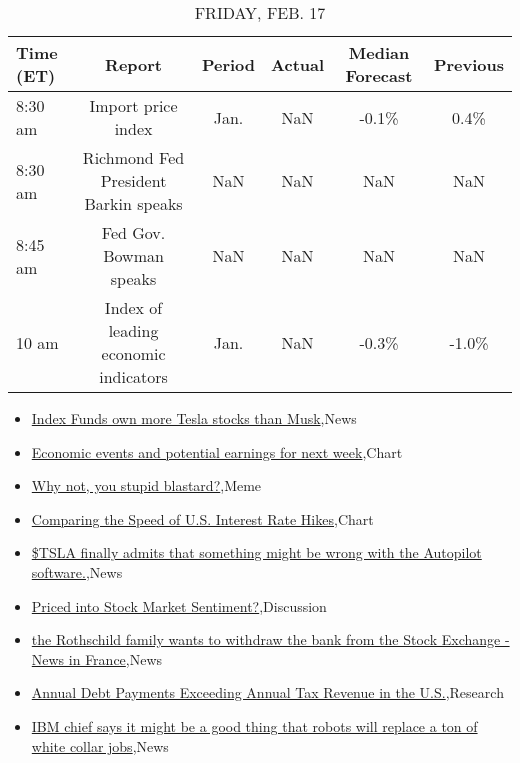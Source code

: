 \documentclass{article}%
\begin{document}
\begin{table}[htbp]%
\caption{FRIDAY, FEB. 17}%
\centering%
\begin{adjustbox}{width=1\textwidth}%
\begin{tabular}{lccccc}
\toprule
Time (ET) &                               Report & Period & Actual & Median Forecast & Previous \\
\midrule
  8:30 am &                   Import price index &   Jan. &    NaN &           -0.1\% &     0.4\% \\
  8:30 am & Richmond Fed President Barkin speaks &    NaN &    NaN &             NaN &      NaN \\
  8:45 am &               Fed Gov. Bowman speaks &    NaN &    NaN &             NaN &      NaN \\
    10 am & Index of leading economic indicators &   Jan. &    NaN &           -0.3\% &    -1.0\% \\
\bottomrule
\end{tabular}
%
\end{adjustbox}%
\end{table}

%
\begin{itemize}%
\item%
\href{https://reddit.com/r/wallstreetbets/comments/1173mjg/index\_funds\_own\_more\_tesla\_stocks\_than\_musk/}{Index Funds own more Tesla stocks than Musk},News%
\item%
\href{https://reddit.com/r/wallstreetbets/comments/116za7v/economic\_events\_and\_potential\_earnings\_for\_next/}{Economic events and potential earnings for next week},Chart%
\item%
\href{https://reddit.com/r/wallstreetbets/comments/116y3cf/why\_not\_you\_stupid\_blastard/}{Why not, you stupid blastard?},Meme%
\item%
\href{https://reddit.com/r/wallstreetbets/comments/116xmki/comparing\_the\_speed\_of\_us\_interest\_rate\_hikes/}{Comparing the Speed of U.S. Interest Rate Hikes},Chart%
\item%
\href{https://reddit.com/r/wallstreetbets/comments/116xc5x/tsla\_finally\_admits\_that\_something\_might\_be\_wrong/}{\$TSLA finally admits that something might be wrong with the Autopilot software.},News%
\item%
\href{https://reddit.com/r/StockMarket/comments/1170x9y/priced\_into\_stock\_market\_sentiment/}{Priced into Stock Market Sentiment?},Discussion%
\item%
\href{https://reddit.com/r/Economics/comments/116s85q/the\_rothschild\_family\_wants\_to\_withdraw\_the\_bank/}{the Rothschild family wants to withdraw the bank from the Stock Exchange - News in France},News%
\item%
\href{https://reddit.com/r/Economics/comments/116oaqj/annual\_debt\_payments\_exceeding\_annual\_tax\_revenue/}{Annual Debt Payments Exceeding Annual Tax Revenue in the U.S.},Research%
\item%
\href{https://reddit.com/r/Economics/comments/116n92s/ibm\_chief\_says\_it\_might\_be\_a\_good\_thing\_that/}{IBM chief says it might be a good thing that robots will replace a ton of white collar jobs},News%
\end{itemize}%
\end{document}
